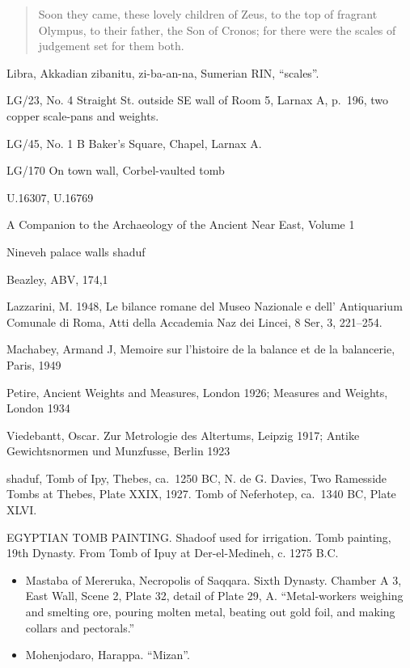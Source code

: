 \documentclass{article}
\begin{document}
\begin{quote}
Soon they came, these lovely children of Zeus, to the top of fragrant Olympus, to their father, the Son of Cronos; for there were the scales of judgement set for them both.
\end{quote}


Libra, Akkadian zibanitu, zi-ba-an-na, Sumerian RIN, ``scales''.



LG/23, No. 4 Straight St. outside SE wall of Room 5, Larnax A, p.~196,
two copper scale-pans and weights.

LG/45, No. 1 B Baker's Square, Chapel, Larnax A.

LG/170 On town wall, Corbel-vaulted tomb

U.16307, U.16769

A Companion to the Archaeology of the Ancient Near East, Volume 1

Nineveh palace walls shaduf

Beazley, ABV, 174,1

Lazzarini, M. 1948, Le bilance romane del Museo Nazionale e dell' Antiquarium Comunale
di Roma, Atti della Accademia Naz dei Lincei, 8 Ser, 3, 221--254.

Machabey, Armand J, Memoire sur l'histoire de la balance et de la balancerie, Paris, 1949

Petire, Ancient Weights and Measures, London 1926; Measures and Weights, London 1934

Viedebantt, Oscar. Zur Metrologie des Altertums, Leipzig 1917; Antike Gewichtsnormen und Munzfusse, Berlin 1923

shaduf, Tomb of Ipy, Thebes, ca.~1250 BC, N. de G. Davies, Two Ramesside Tombs at Thebes, Plate XXIX, 1927.
Tomb of Neferhotep, ca.~1340 BC, Plate XLVI.

EGYPTIAN TOMB PAINTING. Shadoof used for irrigation. Tomb painting, 19th Dynasty. From Tomb of Ipuy at Der-el-Medineh, c. 1275 B.C.


\begin{itemize}
\item Mastaba of Mereruka, Necropolis of Saqqara. Sixth Dynasty. Chamber A 3, East Wall, Scene 2, Plate 32, detail
of Plate 29, A.
 ``Metal-workers weighing and smelting ore, pouring molten metal, beating out gold
foil, and making collars and pectorals.'' \cite[Plate 29]{OIP31}
\item Mohenjodaro, Harappa. ``Mizan''.
\end{itemize}
\end{document}
